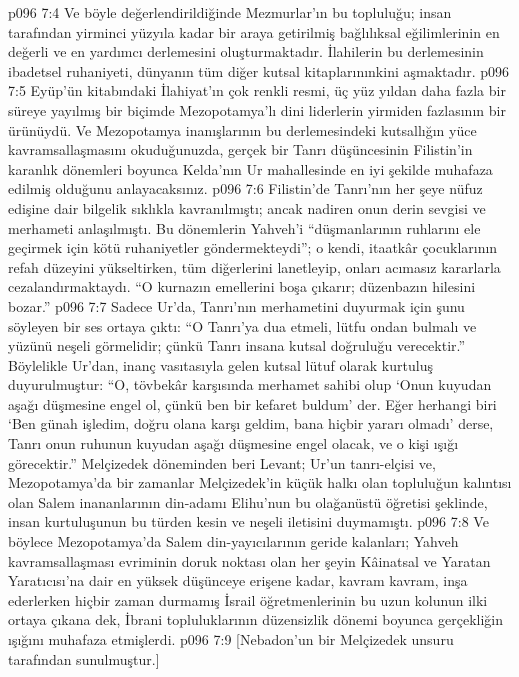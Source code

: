 \vs p096 7:4 Ve böyle değerlendirildiğinde Mezmurlar’ın bu topluluğu; insan tarafından yirminci yüzyıla kadar bir araya getirilmiş bağlılıksal eğilimlerinin en değerli ve en yardımcı derlemesini oluşturmaktadır. İlahilerin bu derlemesinin ibadetsel ruhaniyeti, dünyanın tüm diğer kutsal kitaplarınınkini aşmaktadır.
\vs p096 7:5 Eyüp’ün kitabındaki İlahiyat’ın çok renkli resmi, üç yüz yıldan daha fazla bir süreye yayılmış bir biçimde Mezopotamya’lı dini liderlerin yirmiden fazlasının bir ürünüydü. Ve Mezopotamya inanışlarının bu derlemesindeki kutsallığın yüce kavramsallaşmasını okuduğunuzda, gerçek bir Tanrı düşüncesinin Filistin’in karanlık dönemleri boyunca Kelda’nın Ur mahallesinde en iyi şekilde muhafaza edilmiş olduğunu anlayacaksınız.
\vs p096 7:6 Filistin’de Tanrı’nın her şeye nüfuz edişine dair bilgelik sıklıkla kavranılmıştı; ancak nadiren onun derin sevgisi ve merhameti anlaşılmıştı. Bu dönemlerin Yahveh’i “düşmanlarının ruhlarını ele geçirmek için kötü ruhaniyetler göndermekteydi”; o kendi, itaatkâr çocuklarının refah düzeyini yükseltirken, tüm diğerlerini lanetleyip, onları acımasız kararlarla cezalandırmaktaydı. “O kurnazın emellerini boşa çıkarır; düzenbazın hilesini bozar.”
\vs p096 7:7 Sadece Ur’da, Tanrı’nın merhametini duyurmak için şunu söyleyen bir ses ortaya çıktı: “O Tanrı’ya dua etmeli, lütfu ondan bulmalı ve yüzünü neşeli görmelidir; çünkü Tanrı insana kutsal doğruluğu verecektir.” Böylelikle Ur’dan, inanç vasıtasıyla gelen kutsal lütuf olarak kurtuluş duyurulmuştur: “O, tövbekâr karşısında merhamet sahibi olup ‘Onun kuyudan aşağı düşmesine engel ol, çünkü ben bir kefaret buldum’ der. Eğer herhangi biri ‘Ben günah işledim, doğru olana karşı geldim, bana hiçbir yararı olmadı’ derse, Tanrı onun ruhunun kuyudan aşağı düşmesine engel olacak, ve o kişi ışığı görecektir.” Melçizedek döneminden beri Levant; Ur’un tanrı\hyp{}elçisi ve, Mezopotamya’da bir zamanlar Melçizedek'in küçük halkı olan topluluğun kalıntısı olan Salem inananlarının din\hyp{}adamı Elihu’nun bu olağanüstü öğretisi şeklinde, insan kurtuluşunun bu türden kesin ve neşeli iletisini duymamıştı.
\vs p096 7:8 Ve böylece Mezopotamya’da Salem din\hyp{}yayıcılarının geride kalanları; Yahveh kavramsallaşması evriminin doruk noktası olan her şeyin Kâinatsal ve Yaratan Yaratıcısı’na dair en yüksek düşünceye erişene kadar, kavram kavram, inşa ederlerken hiçbir zaman durmamış İsrail öğretmenlerinin bu uzun kolunun ilki ortaya çıkana dek, İbrani topluluklarının düzensizlik dönemi boyunca gerçekliğin ışığını muhafaza etmişlerdi.
\vs p096 7:9 [Nebadon’un bir Melçizedek unsuru tarafından sunulmuştur.]
